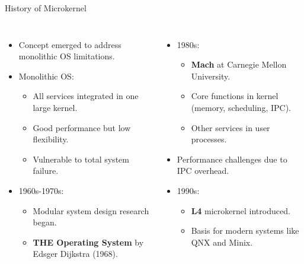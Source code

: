 \documentclass[aspectratio=169, table]{beamer}
\begin{document}
\begin{frame}{History of Microkernel}
\begin{columns}
\begin{itemize}
	\item Concept emerged to address monolithic OS limitations.
	\item Monolithic OS:
	\begin{itemize}
		\item All services integrated in one large kernel.
		\item Good performance but low flexibility.
		\item Vulnerable to total system failure.
	\end{itemize}
	\item 1960s-1970s:
	\begin{itemize}
		\item Modular system design research began.
		\item \textbf{THE Operating System} by Edsger Dijkstra (1968).
	\end{itemize}
\end{itemize}

\begin{itemize}
	\item 1980s:
	\begin{itemize}
		\item \textbf{Mach} at Carnegie Mellon University.
		\item Core functions in kernel (memory, scheduling, IPC).
		\item Other services in user processes.
	\end{itemize}
	\item Performance challenges due to IPC overhead.
	\item 1990s:
	\begin{itemize}
		\item \textbf{L4} microkernel introduced.
		\item Basis for modern systems like QNX and Minix.
	\end{itemize}
\end{itemize}
\end{columns}
\end{frame}
\end{document}
